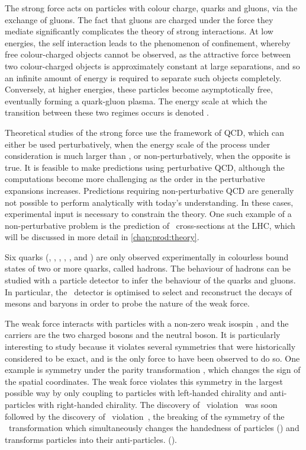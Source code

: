 The strong force acts on particles with colour charge, quarks and gluons, via 
the exchange of gluons.
The fact that gluons are charged under the force they mediate significantly 
complicates the theory of strong interactions.
At low energies, the self interaction leads to the phenomenon of confinement, 
whereby free colour-charged objects cannot be observed, as the attractive force 
between two colour-charged objects is approximately constant at large 
separations, and so an infinite amount of energy is required to separate such 
objects completely.
Conversely, at higher energies, these particles become asymptotically free, 
eventually forming a quark-gluon plasma.
The energy scale at which the transition between these two regimes occurs is 
denoted \qcdscale.

Theoretical studies of the strong force use the framework of \ac{QCD}, which 
can either be used perturbatively, when the energy scale of the process under 
consideration is much larger than \qcdscale, or non-perturbatively, when the 
opposite is true.
It is feasible to make predictions using perturbative \ac{QCD}, although the 
computations become more challenging as the order in the perturbative 
expansions increases.
Predictions requiring non-perturbative \ac{QCD} are generally not possible to 
perform analytically with today's understanding.
In these cases, experimental input is necessary to constrain the theory.
One such example of a non-perturbative problem is the prediction of \pp\ 
cross-sections at the \ac{LHC}, which will be discussed in more detail in 
\cref{chap:prod:theory}.

Six quarks (\Pup, \Pdown, \Pcharm, \Pstrange, \Ptop, and \Pbottom) are only 
observed experimentally in colourless bound states of two or more quarks, 
called hadrons.
The behaviour of hadrons can be studied with a particle detector to infer the 
behaviour of the quarks and gluons.
In particular, the \lhcb\ detector is optimised to select and reconstruct the 
decays of mesons and baryons in order to probe the nature of the weak force.

The weak force interacts with particles with a non-zero weak isospin \wisospin, 
and the carriers are the two charged \PWpm bosons and the neutral \PZ boson.
It is particularly interesting to study because it violates several symmetries 
that were historically considered to be exact, and is the only force to have 
been observed to do so.
One example is symmetry under the parity transformation \Ptransform, which 
changes the sign of the spatial coordinates.
The weak force violates this symmetry in the largest possible way by only 
coupling to particles with left-handed chirality and anti-particles with 
right-handed chirality.
The discovery of \Ptransform\ violation~\cite{Wu:1957my} was soon followed by 
the discovery of \CP\ violation~\cite{Christenson:1964fg}, the breaking of the 
symmetry of the \CP\ transformation which simultaneously changes the handedness 
of particles (\Ptransform) and transforms particles into their anti-particles.  
(\Ctransform).

